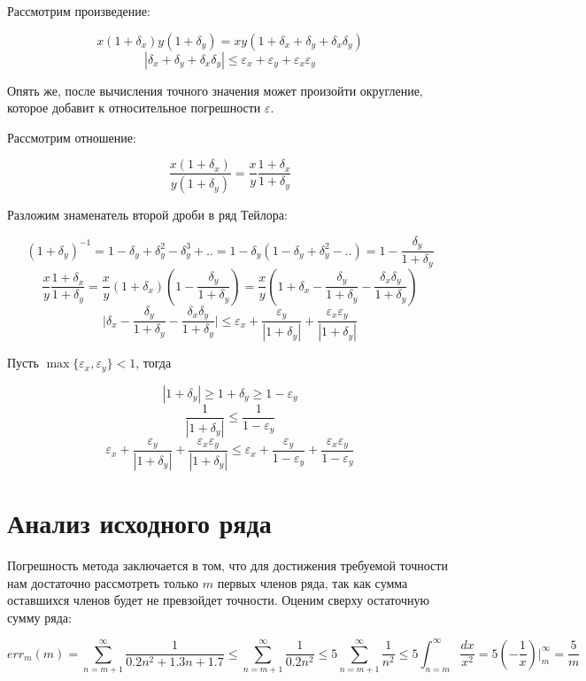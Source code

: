 \documentclass[11pt,a4paper,oneside]{article}
\begin{document}
Рассмотрим произведение:

$$ x (1 + \delta_x) y (1 + \delta_y) = xy (1 + \delta_x + \delta_y + \delta_x \delta_y) $$
$$ |\delta_x + \delta_y + \delta_x \delta_y|
	\le \varepsilon_x + \varepsilon_y + \varepsilon_x \varepsilon_y $$
	
Опять же, после вычисления точного значения может произойти округление, которое добавит к относительное погрешности $\varepsilon$.

Рассмотрим отношение:

$$ \frac{x (1 + \delta_x)}{y (1 + \delta_y)} = \frac{x}{y} \frac{1 + \delta_x}{1 + \delta_y} $$

Разложим знаменатель второй дроби в ряд Тейлора:

$$ (1 + \delta_y)^{-1} = 1 - \delta_y + \delta_y^2 - \delta_y^3 + .. = 1 - \delta_y (1 - \delta_y + \delta_y^2 - ..) = 1 - \frac{\delta_y}{1 + \delta_y} $$
$$ \frac{x}{y} \frac{1 + \delta_x}{1 + \delta_y}
	= \frac{x}{y} (1 + \delta_x) (1 - \frac{\delta_y}{1 + \delta_y})
	= \frac{x}{y} (1 
		+ \delta_x - \frac{\delta_y}{1 + \delta_y} - \frac{\delta_x \delta_y}{1 + \delta_y}) $$
$$ \biggr|\delta_x - \frac{\delta_y}{1 + \delta_y} - \frac{\delta_x \delta_y}{1 + \delta_y}\biggr|
	\le \varepsilon_x
		+ \frac{\varepsilon_y}{|1 + \delta_y|}
		+ \frac{\varepsilon_x \varepsilon_y}{|1 + \delta_y|} $$
		
Пусть $\max\{\varepsilon_x, \varepsilon_y\} < 1$, тогда

$$ |1 + \delta_y| \ge 1 + \delta_y \ge 1 - \varepsilon_y $$
$$ \frac{1}{|1 + \delta_y|} \le \frac{1}{1 - \varepsilon_y} $$
$$ \varepsilon_x
		+ \frac{\varepsilon_y}{|1 + \delta_y|}
		+ \frac{\varepsilon_x \varepsilon_y}{|1 + \delta_y|}
	\le \varepsilon_x
		+ \frac{\varepsilon_y}{1 - \varepsilon_y}
		+ \frac{\varepsilon_x \varepsilon_y}{1 - \varepsilon_y} $$

\section{Анализ исходного ряда}

Погрешность метода заключается в том, что для достижения требуемой точности нам достаточно рассмотреть только $m$ первых членов ряда, так как сумма оставшихся членов будет не превзойдет точности. Оценим сверху остаточную сумму ряда:

$$ err_{m}(m) = \sum_{n = m + 1}^{\infty} \frac{1}{0.2n^2 + 1.3n + 1.7} 
	\le \sum_{n = m + 1}^{\infty} \frac{1}{0.2n^2}
	\le 5 \sum_{n = m + 1}^{\infty} \frac{1}{n^2}
	\le 5 \int_{n = m}^{\infty} \frac{dx}{x^2}
	= 5 (- \frac{1}{x})\biggr|_{m}^{\infty}
	= \frac{5}{m}$$
	
\end{document}
